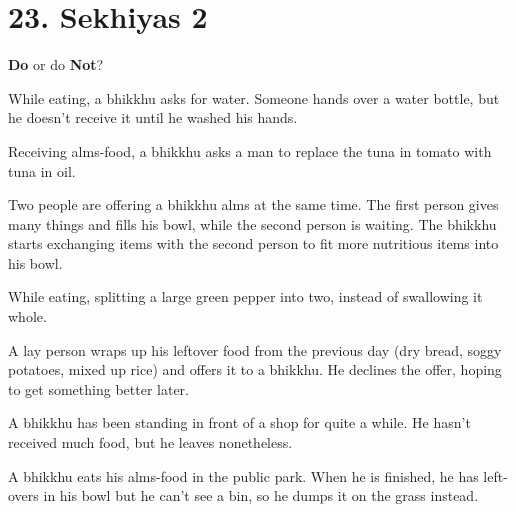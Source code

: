 \chapter{23. Sekhiyas 2}
\renewcommand*{\theChapterTitle}{23. Sekhiyas 2}

\begin{exam}{\autoExamName}

  \begin{problem*}
    \textbf{Do} or do \textbf{Not}?

    \bigskip

    \begin{parts}

    \item {} While eating, a bhikkhu asks for water. Someone hands over a
      water bottle, but he doesn't receive it until he washed his hands.

    \bigskip

    \item {} Receiving alms-food, a bhikkhu asks a man to replace the tuna
      in tomato with tuna in oil.

    \bigskip

    \item {} Two people are offering a bhikkhu alms at the same time. The
      first person gives many things and fills his bowl, while the second person
      is waiting. The bhikkhu starts exchanging items with the second person to
      fit more nutritious items into his bowl.

    \bigskip

    \item {} While eating, splitting a large green pepper into two, instead
    of swallowing it whole.

    \bigskip

    \item {} A lay person wraps up his leftover food from the previous day
      (dry bread, soggy potatoes, mixed up rice) and offers it to a bhikkhu. He
      declines the offer, hoping to get something better later.

    \bigskip

    \item {} A bhikkhu has been standing in front of a shop for quite a while.
    He hasn't received much food, but he leaves nonetheless.

    \bigskip

    \item {} A bhikkhu eats his alms-food in the public park. When he is
      finished, he has left-overs in his bowl but he can't see a bin, so he
      dumps it on the grass instead.


\end{parts}
\end{problem*}
\end{exam}
